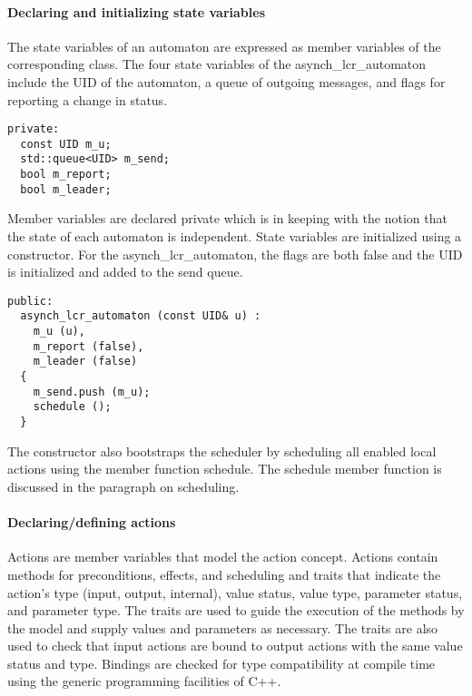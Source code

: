 \paragraph*{Declaring and initializing state variables}
The state variables of an automaton are expressed as member variables of the corresponding class.
The four state variables of the asynch\_lcr\_automaton include the UID of the automaton, a queue of outgoing messages, and flags for reporting a change in status.
\ifjournal
\begin{lstlisting}
private:
  const UID m_u;
  std::queue<UID> m_send;
  bool m_report;
  bool m_leader;
\end{lstlisting}
\fi
Member variables are declared private which is in keeping with the notion that the state of each automaton is independent.
State variables are initialized using a constructor.
For the asynch\_lcr\_automaton, the flags are both false and the UID is initialized and added to the send queue.
\ifjournal
\begin{lstlisting}
public:
  asynch_lcr_automaton (const UID& u) :
    m_u (u),
    m_report (false),
    m_leader (false)
  {
    m_send.push (m_u);
    schedule ();
  }
\end{lstlisting}
\fi
The constructor also bootstraps the scheduler by scheduling all enabled local actions using the member function schedule.
The schedule member function is discussed in the paragraph on scheduling.

\paragraph*{Declaring/defining actions}
Actions are member variables that model the action concept.
Actions contain methods for preconditions, effects, and scheduling and traits that indicate the action's type (input, output, internal), value status, value type, parameter status, and parameter type.
The traits are used to guide the execution of the methods by the model and supply values and parameters as necessary.
The traits are also used to check that input actions are bound to output actions with the same value status and type.
Bindings are checked for type compatibility at compile time using the generic programming facilities of C++.

